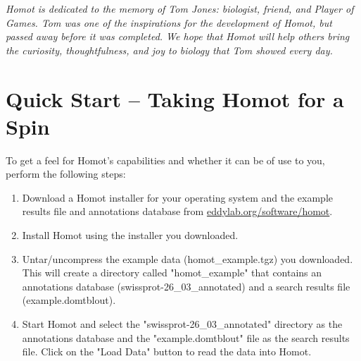 \documentclass[notoc,justified,openany]{tufte-book}    %
\newcommand{\homot }{{Homot}\xspace}  %
\newcommand{\Homot}{{Homot}\xspace}
\newcommand{\homotloc}{\url{eddylab.org/software/homot}\xspace}
\begin{document}

\setcounter{tocdepth}{2}             %

\maketitle




\pagebreak
\hspace{0pt}
\vfill
\emph{\Homot is dedicated to the memory of Tom Jones: biologist, friend, and Player of Games. Tom was one of the inspirations for the development of \homot, but passed away before it was completed.  We hope that \homot will help others bring the curiosity, thoughtfulness, and joy to biology that Tom showed every day.}
\vfill
\hspace{0pt}
\tableofcontents

\chapter{Quick Start -- Taking \homot for a Spin}
To get a feel for \homot's capabilities and whether it can be of use to you, perform the following steps:

\begin{enumerate}
  \item{Download a \homot installer for your operating system and the example results file and annotations database from \homotloc.}
  \item{Install \homot using the installer you downloaded.}
  \item{Untar/uncompress the example data (homot\_example.tgz) you downloaded.  This will create a directory called "homot\_example" that contains an annotations database (swissprot-26\_03\_annotated) and a search results file (example.domtblout).}
  \item{Start \homot and select the "swissprot-26\_03\_annotated" directory as the annotations database and the "example.domtblout" file as the search results file.  Click on the "Load Data" button to read the data into \homot.}
\end{enumerate}
\end{document}
